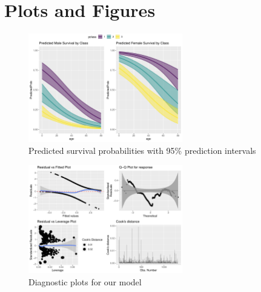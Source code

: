 \documentclass[9pt]{extarticle}
\begin{document}
%

\appendix

\section{Plots and Figures}

\begin{figure}[H]
	\centering
	\includegraphics[width=0.6\textwidth]{psurvage}
	\caption{Predicted survival probabilities with 95\% prediction intervals}
	\label{fig:psurvage}
\end{figure}

\begin{figure}[H]
	\centering
	\includegraphics[width=0.6\textwidth]{modeldiag}
	\caption{Diagnostic plots for our model}
	\label{fig:modeldiag}
\end{figure}
\end{document}

